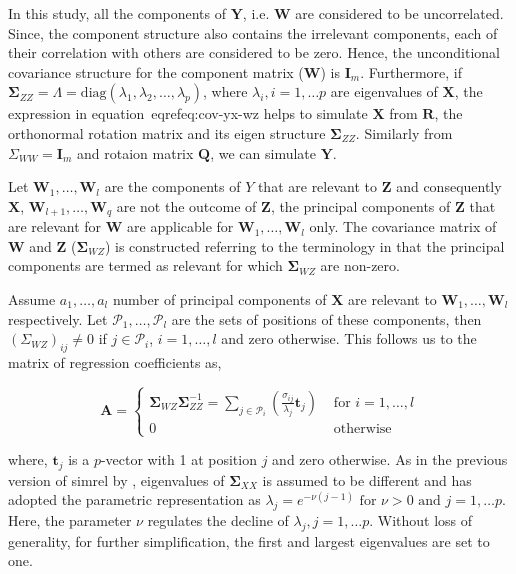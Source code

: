 \documentclass[12pt,A4paper,authoryear]{elsarticle} %
\begin{document}
In this study, all the components of \(\mathbf{Y}\), i.e. \(\mathbf{W}\)
are considered to be uncorrelated. Since, the component structure also
contains the irrelevant components, each of their correlation with
others are considered to be zero. Hence, the unconditional covariance
structure for the component matrix (\(\mathbf{W}\)) is \(\mathbf{I}_m\).
Furthermore, if
\(\boldsymbol{\Sigma}_{ZZ} = \Lambda = \text{diag}({\lambda_1, \lambda_2, \ldots, \lambda_p})\),
where \(\lambda_i, i = 1, \ldots p\) are eigenvalues of \(\mathbf{X}\),
the expression in \mbox{equation~\\eqref{eq:cov-yx-wz}} helps to simulate
\(\mathbf{X}\) from \(\mathbf{R}\), the orthonormal rotation matrix and
its eigen structure \(\boldsymbol{\Sigma}_{ZZ}\). Similarly from
\(\Sigma_{WW} = \mathbf{I}_m\) and rotaion matrix \(\mathbf{Q}\), we can
simulate \(\mathbf{Y}\).

Let \(\mathbf{W}_1, \ldots, \mathbf{W}_l\) are the components of \(Y\)
that are relevant to \(\mathbf{Z}\) and consequently \(\mathbf{X}\),
\(\mathbf{W}_{l+1}, \ldots, \mathbf{W}_q\) are not the outcome of
\(\mathbf{Z}\), the principal components of \(\mathbf{Z}\) that are
relevant for \(\mathbf{W}\) are applicable for
\(\mathbf{W}_1, \ldots, \mathbf{W}_l\) only. The covariance matrix of
\(\mathbf{W}\) and \(\mathbf{Z}\) (\(\boldsymbol{\Sigma}_{WZ}\)) is
constructed referring to the terminology in
\citet{helland1994comparison} that the principal components are termed
as relevant for which \(\boldsymbol{\Sigma}_{WZ}\) are non-zero.

Assume \(a_1, \ldots, a_l\) number of principal components of
\(\mathbf{X}\) are relevant to \(\mathbf{W}_1, \ldots, \mathbf{W}_l\)
respectively. Let \(\mathcal{P}_1, \ldots, \mathcal{P}_l\) are the sets
of positions of these components, then \((\Sigma_{WZ})_{ij} \ne 0\) if
\(j \in \mathcal{P}_i\), \(i = 1, \ldots, l\) and zero otherwise. This
follows us to the matrix of regression coefficients as,

\begin{equation}
  \mathbf{A} =
  \begin{cases}
    \boldsymbol{\Sigma}_{WZ}\boldsymbol{\Sigma}_{ZZ}^{-1} =
    \sum_{j \in \mathcal{P}_i}{\left(\frac{\sigma_{ij}}{\lambda_j} \mathbf{t}_j\right)} & \text{ for } i = 1, \ldots, l \\
    0 & \text{ otherwise }
  \end{cases}
\end{equation}

where, \(\mathbf{t}_j\) is a \(p\)-vector with 1 at position \(j\) and
zero otherwise. As in the previous version of simrel by
\citet{saebo2015simrel}, eigenvalues of \(\boldsymbol{\Sigma}_{XX}\) is
assumed to be different and has adopted the parametric representation as
\(\lambda_j = e^{-\nu(j - 1)}\text{ for } \nu>0 \text{ and } j = 1, \ldots p\).
Here, the parameter \(\nu\) regulates the decline of
\(\lambda_j, j = 1, \ldots p\). Without loss of generality, for further
simplification, the first and largest eigenvalues are set to one.
\end{document}
